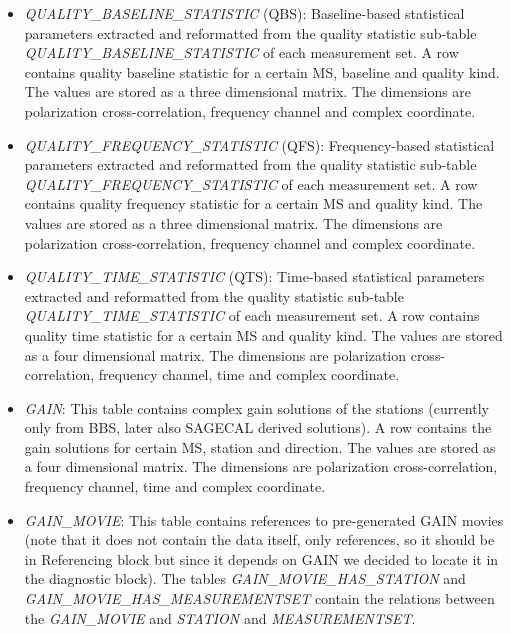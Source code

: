 \documentclass[a4paper,11pt]{article}
\begin{document}
\begin{itemize}
	\item \textit{QUALITY\_BASELINE\_STATISTIC} (QBS): Baseline-based statistical parameters extracted and reformatted from the quality statistic sub-table \textit{QUALITY\_BASELINE\_STATISTIC} of each measurement set. A row contains quality baseline statistic for a certain MS, baseline and quality kind. The values are stored as a three dimensional matrix. The dimensions are polarization cross-correlation, frequency channel and complex coordinate. 
	
	\item \textit{QUALITY\_FREQUENCY\_STATISTIC} (QFS): Frequency-based statistical parameters extracted and reformatted from the quality statistic sub-table \textit{QUALITY\_FREQUENCY\_STATISTIC} of each measurement set. A row contains quality frequency statistic for a certain MS and quality kind. The values are stored as a three dimensional matrix. The dimensions are polarization cross-correlation, frequency channel and complex coordinate. 
	
	\item \textit{QUALITY\_TIME\_STATISTIC} (QTS): Time-based statistical parameters extracted and reformatted from the quality statistic sub-table \textit{QUALITY\_TIME\_STATISTIC} of each measurement set. A row contains quality time statistic for a certain MS and quality kind. The values are stored as a four dimensional matrix. The dimensions are polarization cross-correlation, frequency channel, time and complex coordinate. 
	
	\item \textit{GAIN}: This table contains complex gain solutions of the stations (currently only from BBS, later also SAGECAL derived solutions). A row contains the gain solutions for certain MS, station and direction. The values are stored as a four dimensional matrix. The dimensions are polarization cross-correlation, frequency channel, time and complex coordinate. 
	
	\item \textit{GAIN\_MOVIE}: This table contains references to pre-generated GAIN movies (note that it does not contain the data itself, only references, so it should be in Referencing block but since it depends on GAIN we decided to locate it in the diagnostic block). The tables \textit{GAIN\_MOVIE\_HAS\_STATION} and \textit{GAIN\_MOVIE\_HAS\_MEASUREMENTSET} contain the relations between the \textit{GAIN\_MOVIE} and \textit{STATION} and \textit{MEASUREMENTSET}.  
\end{itemize}
\end{document}
